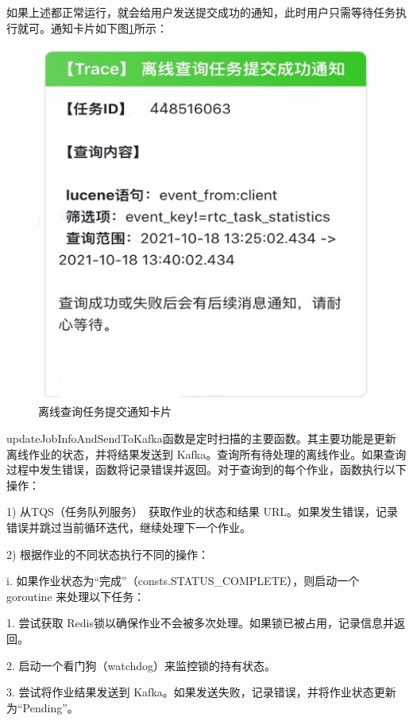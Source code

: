 \begin{longtable}[htbp]
如果上述都正常运行，就会给用户发送提交成功的通知，此时用户只需等待任务执行就可。通知卡片如下图\ref{offlineSearchTaskCard}所示：
 \begin{figure}[htbp]
  \centering
  \includegraphics[scale=0.5]{figure/chapter5/离线查询任务提交通知卡片.jpg}
  \caption{离线查询任务提交通知卡片}\label{offlineSearchTaskCard}
\end{figure}
\newpage
updateJobInfoAndSendToKafka函数是定时扫描的主要函数。其主要功能是更新离线作业的状态，并将结果发送到 Kafka。查询所有待处理的离线作业。如果查询过程中发生错误，函数将记录错误并返回。对于查询到的每个作业，函数执行以下操作：

1)	从TQS（任务队列服务）~\cite{李磊2019基于李雅普诺夫优化的容器云队列在线任务和资源调度设计}获取作业的状态和结果 URL。如果发生错误，记录错误并跳过当前循环迭代，继续处理下一个作业。

2)	根据作业的不同状态执行不同的操作：

i.	如果作业状态为“完成”（consts.STATUS\_COMPLETE），则启动一个 goroutine 来处理以下任务：

1.	尝试获取 Redis锁\cite{赖歆2016基于}以确保作业不会被多次处理。如果锁已被占用，记录信息并返回。

2.	启动一个看门狗（watchdog）来监控锁的持有状态。

3.	尝试将作业结果发送到 Kafka。如果发送失败，记录错误，并将作业状态更新为“Pending”。


\end{longtable}
